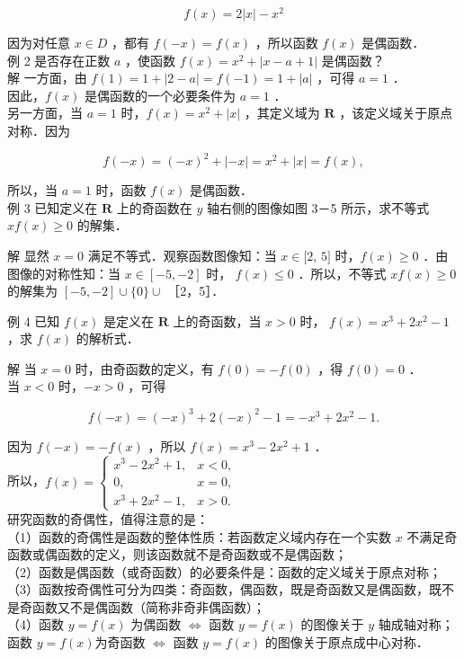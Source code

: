 \documentclass[10pt]{article}
\begin{document}
\[
f(x)=2|x|-x^{2}
\]

因为对任意 \(x \in D\) ，都有 \(f(-x)=f(x)\) ，所以函数 \(f(x)\) 是偶函数．\\
例 2 是否存在正数 \(a\) ，使函数 \(f(x)=x^{2}+|x-a+1|\) 是偶函数？\\
解 一方面，由 \(f(1)=1+|2-a|=f(-1)=1+|a|\) ，可得 \(a=1\) ．\\
因此，\(f(x)\) 是偶函数的一个必要条件为 \(a=1\) ．\\
另一方面，当 \(a=1\) 时，\(f(x)=x^{2}+|x|\) ，其定义域为 \(\mathbf{R}\) ，该定义域关于原点对称．因为

\[
f(-x)=(-x)^{2}+|-x|=x^{2}+|x|=f(x),
\]

所以，当 \(a=1\) 时，函数 \(f(x)\) 是偶函数．\\
例 3 已知定义在 \(\mathbf{R}\) 上的奇函数在 \(y\) 轴右侧的图像如图 3－5 所示，求不等式 \(x f(x) \geqslant 0\) 的解集．

解 显然 \(x=0\) 满足不等式．观察函数图像知：当 \(x \in[2\), \(5]\) 时，\(f(x) \geqslant 0\) ．由图像的对称性知：当 \(x \in[-5,-2]\) 时， \(f(x) \leqslant 0\) ．所以，不等式 \(x f(x) \geqslant 0\) 的解集为 \([-5,-2] \cup\{0\} \cup\) ［2，5］．

例 4 已知 \(f(x)\) 是定义在 \(\mathbf{R}\) 上的奇函数，当 \(x>0\) 时， \(f(x)=x^{3}+2 x^{2}-1\) ，求 \(f(x)\) 的解析式．

解 当 \(x=0\) 时，由奇函数的定义，有 \(f(0)=-f(0)\) ，得 \(f(0)=0\) ．\\
当 \(x<0\) 时，\(-x>0\) ，可得

\[
f(-x)=(-x)^{3}+2(-x)^{2}-1=-x^{3}+2 x^{2}-1 .
\]

因为 \(f(-x)=-f(x)\) ，所以 \(f(x)=x^{3}-2 x^{2}+1\) ．\\
所以，\(f(x)= \begin{cases}x^{3}-2 x^{2}+1, & x<0, \\ 0, & x=0, \\ x^{3}+2 x^{2}-1, & x>0 .\end{cases}\)\\
研究函数的奇偶性，值得注意的是：\\
（1）函数的奇偶性是函数的整体性质：若函数定义域内存在一个实数 \(x\) 不满足奇函数或偶函数的定义，则该函数就不是奇函数或不是偶函数；\\
（2）函数是偶函数（或奇函数）的必要条件是：函数的定义域关于原点对称；\\
（3）函数按奇偶性可分为四类：奇函数，偶函数，既是奇函数又是偶函数，既不是奇函数又不是偶函数（简称非奇非偶函数）；\\
（4）函数 \(y=f(x)\) 为偶函数 \(\Leftrightarrow\) 函数 \(y=f(x)\) 的图像关于 \(y\) 轴成轴对称；函数 \(y=f(x)\)为奇函数 \(\Leftrightarrow\) 函数 \(y=f(x)\) 的图像关于原点成中心对称．
\end{document}
